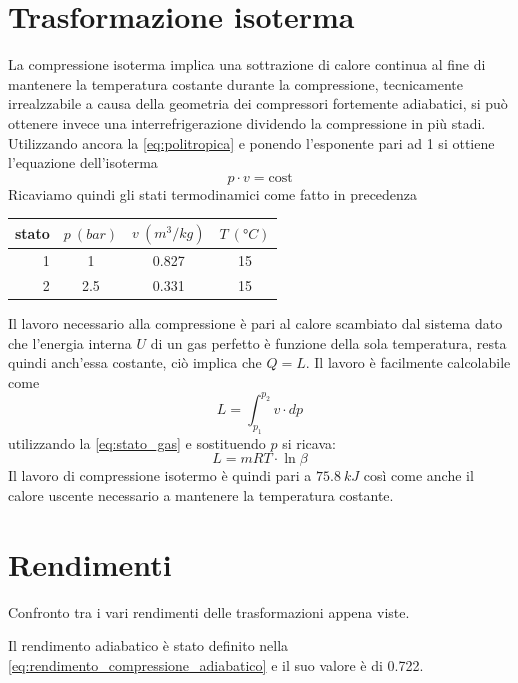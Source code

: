 \documentclass[a4paper,12pt]{article}
\begin{document}
\section{Trasformazione isoterma}
\label{sec:quarta_trasformazione}
La compressione isoterma implica una sottrazione di calore continua al fine di mantenere la temperatura
costante durante la compressione, tecnicamente irrealzzabile a causa della geometria dei compressori
fortemente adiabatici, si può ottenere invece una interrefrigerazione dividendo la compressione in più 
stadi.
Utilizzando ancora la \eqref{eq:politropica} e ponendo l'esponente pari ad 1 si ottiene l'equazione dell'isoterma
\begin{equation}
    p\cdot v = \text{cost}
\end{equation}
Ricaviamo quindi gli stati termodinamici come fatto in precedenza
\begin{center}
    \begin{tabular}{r|c|c|c}
        stato    & $p\ (bar)$ & $v\ (m^3/kg)$ & $T\ (\text{°}C) $\\ \hline
        1   &           1 &          0.827    &           15     \\ \hline
        2   &         2.5 &          0.331    &           15
    \end{tabular}
\end{center}
Il lavoro necessario alla compressione è pari al calore scambiato dal sistema dato che l'energia interna $U$
di un gas perfetto è funzione della sola temperatura, resta quindi anch'essa costante, ciò implica che
$Q = L$.
Il lavoro è facilmente calcolabile come 
\begin{equation}
    L = \int_{p_1}^{p_2} v\cdot dp
\end{equation}
utilizzando la \eqref{eq:stato_gas} e sostituendo $p$ si ricava:
\begin{equation}
    L = mRT\cdot \ln\beta
\end{equation}
Il lavoro di compressione isotermo è quindi pari a $75.8\ kJ$ così come anche il calore uscente necessario a 
mantenere la temperatura costante.

\section{Rendimenti}
Confronto tra i vari rendimenti delle trasformazioni appena viste.

Il rendimento adiabatico è stato definito nella \eqref{eq:rendimento_compressione_adiabatico} e il suo valore è di 0.722.
\end{document}
